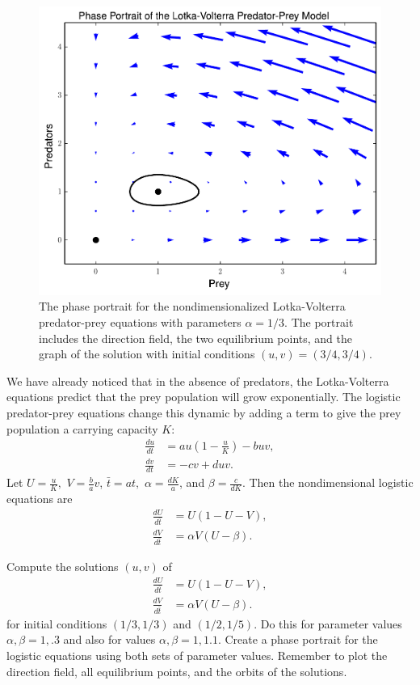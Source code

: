\begin{figure}
\centering
\includegraphics[width=\textwidth]{Lotka_Volterra_Phase_Portrait.pdf}
\caption{The phase portrait for the nondimensionalized Lotka-Volterra predator-prey equations with parameters $\alpha = 1/3$. 
The portrait includes the direction field, the two equilibrium points, and the graph of the solution with initial conditions $(u,v) = (3/4, 3/4)$. }
\label{fig:pred-prey_Lotka_Voterra_Phase_Portrait}
\end{figure}

We have already noticed that in the absence of predators, the Lotka-Volterra equations predict that the prey population will grow exponentially.
The logistic predator-prey equations change this dynamic by adding a term to give the prey population a carrying capacity $K$: 
\begin{align*}
	\frac{du}{dt} &= au\left(1 -\frac{u}{K}\right) - buv,\\
	\frac{dv}{dt} &= -cv + duv.
\end{align*}
Let $U = \frac{u}{K},$ $V = \frac{b}{a}v$, $\bar{t} = at,$  $\alpha = \frac{dK}{a}$, and $\beta = \frac{c}{dK}$.
Then the nondimensional logistic equations are 
\begin{align*}
	\frac{dU}{d\bar{t}} &= U(1-U-V),\\
	\frac{dV}{d\bar{t}} &= \alpha V (U-\beta).
\end{align*}

\begin{problem}
Compute the solutions $(u,v)$ of 
\begin{align*}
	\frac{dU}{d\bar{t}} &= U(1-U-V),\\
	\frac{dV}{d\bar{t}} &= \alpha V (U-\beta).
\end{align*}
for initial conditions $(1/3, 1/3)$ and $(1/2, 1/5)$.
Do this for parameter values $\alpha, \beta = 1, .3$ and also for values $\alpha, \beta = 1, 1.1$.
Create a phase portrait for the logistic equations using both sets of parameter values.
Remember to plot the direction field, all equilibrium points, and the orbits of the solutions.
\end{problem}